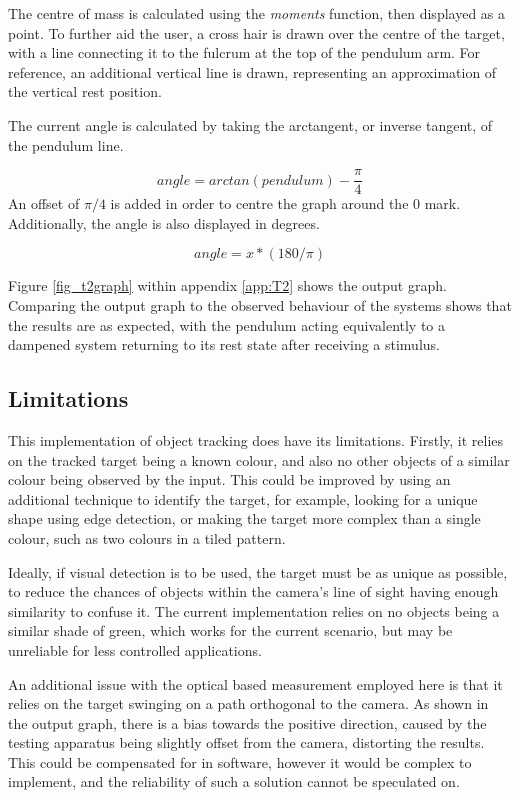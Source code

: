 \documentclass[conference]{IEEEtran}
\begin{document}
The centre of mass is calculated using the \textit{moments} function, then displayed as a point. To further aid the user, a cross hair is drawn over the centre of the target, with a line connecting it to the fulcrum at the top of the pendulum arm. For reference, an additional vertical line is drawn, representing an approximation of the vertical rest position.

The current angle is calculated by taking the arctangent, or inverse tangent, of the pendulum line.

\begin{equation}
angle = arctan(pendulum) - \frac{\pi}{4}
\end{equation}
An offset of $\pi /4$ is added in order to centre the graph around the 0 mark. Additionally, the angle is also displayed in degrees.

\begin{equation}
angle = x*(180/\pi )
\end{equation}

Figure \ref{fig_t2graph} within appendix \ref{app:T2} shows the output graph. Comparing the output graph to the observed behaviour of the systems shows that the results are as expected, with the pendulum acting equivalently to a dampened system returning to its rest state after receiving a stimulus.

\subsection{Limitations}\label{sec:t2_lim}
This implementation of object tracking does have its limitations. Firstly, it relies on the tracked target being a known colour, and also no other objects of a similar colour being observed by the input. This could be improved by using an additional technique to identify the target, for example, looking for a unique shape using edge detection, or making the target more complex than a single colour, such as two colours in a tiled pattern.

Ideally, if visual detection is to be used, the target must be as unique as possible, to reduce the chances of objects within the camera's line of sight having enough similarity to confuse it. The current implementation relies on no objects being a similar shade of green, which works for the current scenario, but may be unreliable for less controlled applications. 

An additional issue with the optical based measurement employed here is that it relies on the target swinging on a path orthogonal to the camera. As shown in the output graph, there is a bias towards the positive direction, caused by the testing apparatus being slightly offset from the camera, distorting the results. This could be compensated for in software, however  it would be complex to implement, and the reliability of such a solution cannot be speculated on.
\end{document}
